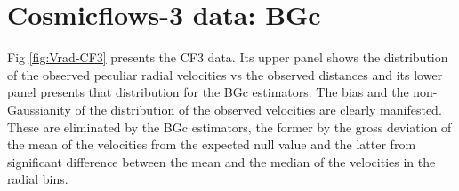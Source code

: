\documentclass[useAMS,usenatbib]{mn2e}
\begin{document}


\section{Cosmicflows-3 data: BGc}
\label{sec:CF3-BGc}
Fig  \ref{fig:Vrad-CF3} presents the CF3 data. Its upper panel shows the distribution of  the observed peculiar  radial velocities  vs the observed  distances and its lower panel presents that distribution for the  BGc estimators.  The  bias and the non-Gaussianity of the distribution of the observed velocities are clearly manifested. These are eliminated  by the BGc estimators, the former by the gross deviation of the mean of the velocities from the expected null value and the latter from significant difference between the mean and the median of the velocities in the radial bins.
\end{document}
